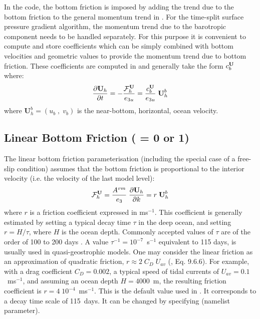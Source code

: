 \documentclass[NEMO_book]{subfiles}
\begin{document}
In the code, the bottom friction is imposed by adding the trend due to the bottom 
friction to the general momentum trend in . For the time-split surface 
pressure gradient algorithm, the momentum trend due to the barotropic component 
needs to be handled separately. For this purpose it is convenient to compute and 
store coefficients which can be simply combined with bottom velocities and geometric 
values to provide the momentum trend due to bottom friction. 
These coefficients are computed in  and generally take the form 
$c_b^{\textbf U}$ where:
\begin{equation} \label{Eq_zdfbfr_bdef}
\frac{\partial {\textbf U_h}}{\partial t} = 
  - \frac{{\cal F}^{\textbf U}_{h}}{e_{3u}} = \frac{c_b^{\textbf U}}{e_{3u}} \;{\textbf U}_h^b
\end{equation}
where $\textbf{U}_h^b = (u_b\;,\;v_b)$ is the near-bottom, horizontal, ocean velocity.

\subsection{Linear Bottom Friction ( = 0 or 1) }
\label{ZDF_bfr_linear}

The linear bottom friction parameterisation (including the special case 
of a free-slip condition) assumes that the bottom friction 
is proportional to the interior velocity (i.e. the velocity of the last 
model level):
\begin{equation} \label{Eq_zdfbfr_linear}
{\cal F}_h^\textbf{U} = \frac{A^{vm}}{e_3} \; \frac{\partial \textbf{U}_h}{\partial k} = r \; \textbf{U}_h^b
\end{equation}
where $r$ is a friction coefficient expressed in ms$^{-1}$. 
This coefficient is generally estimated by setting a typical decay time 
$\tau$ in the deep ocean, 
and setting $r = H / \tau$, where $H$ is the ocean depth. Commonly accepted 
values of $\tau$ are of the order of 100 to 200 days \citep{Weatherly_JMR84}. 
A value $\tau^{-1} = 10^{-7}$~s$^{-1}$ equivalent to 115 days, is usually used 
in quasi-geostrophic models. One may consider the linear friction as an 
approximation of quadratic friction, $r \approx 2\;C_D\;U_{av}$ (\citet{Gill1982}, 
Eq. 9.6.6). For example, with a drag coefficient $C_D = 0.002$, a typical speed 
of tidal currents of $U_{av} =0.1$~m\;s$^{-1}$, and assuming an ocean depth 
$H = 4000$~m, the resulting friction coefficient is $r = 4\;10^{-4}$~m\;s$^{-1}$. 
This is the default value used in \NEMO. It corresponds to a decay time scale 
of 115~days. It can be changed by specifying  (namelist parameter).
\end{document}
